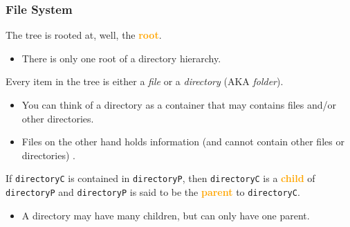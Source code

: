 \documentclass[xcolor=svgnames, colorlinks, handout]{beamer}
\newcommand{\nl}{\\[1em]}
\newcommand{\define}[1]{\textbf{\textcolor{orange}{#1}}}
\newcommand{\ft}[1]{\frametitle{#1}}
\begin{document}
\begin{frame}[fragile]\ft{File System}
The tree is rooted at, well, the \define{root}. 
\begin{itemize}
\item There is only one root of a directory hierarchy.\nl
\end{itemize}
Every item in the tree is either a \emph{file} or a \emph{directory} (AKA \emph{folder}).
\begin{itemize}
\item You can think of a directory as a container that may contains files and/or other directories.
\item Files on the other hand holds information (and cannot contain other files or directories) .\nl
\end{itemize}
If {\tt directoryC} is contained  in {\tt directoryP}, then  {\tt directoryC} is a \define{child} of {\tt directoryP} and {\tt directoryP} is said to be the \define{parent} to {\tt directoryC}.
\begin{itemize}
\item A directory may have many children, but can only have one parent.
\end{itemize}
\end{frame}


\end{document}
